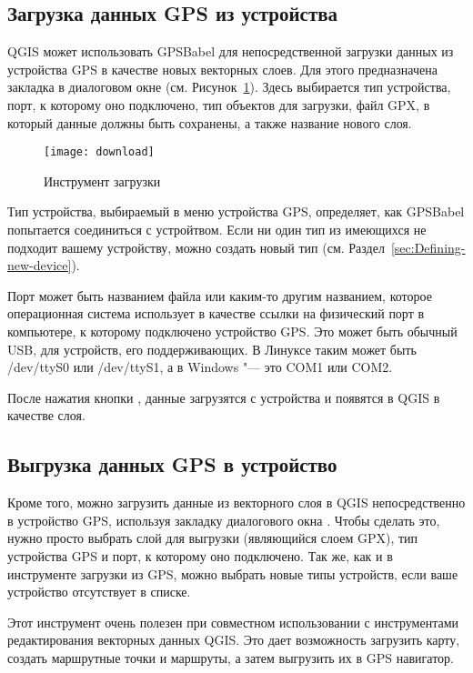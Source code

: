 \subsection{Загрузка данных GPS из устройства}

QGIS может использовать GPSBabel для непосредственной загрузки данных из
устройства GPS в качестве новых векторных слоев. Для этого предназначена
закладка  в диалоговом окне 
(см. Рисунок~\ref{figure_download}). Здесь выбирается тип устройства,
порт, к которому оно подключено, тип объектов для загрузки, файл GPX, в
который данные должны быть сохранены, а также название нового слоя.

\begin{figure}[ht]
   \centering
   \texttt{[image: download]}
   \caption{Инструмент загрузки \wincaption}\label{figure_download}
\end{figure}

Тип устройства, выбираемый в меню устройства GPS, определяет, как
GPSBabel попытается соединиться с устройтвом. Если ни один тип из
имеющихся не подходит вашему устройству, можно создать новый тип
(см. Раздел~\ref{sec:Defining-new-device}).

Порт может быть названием файла или каким-то другим названием, которое
операционная система использует в качестве ссылки на физический порт в
компьютере, к которому подключено устройство GPS. Это может быть
обычный USB, для устройств, его поддерживающих.
\nix В Линуксе таким может быть /dev/ttyS0 или /dev/ttyS1, а в
\win Windows "--- это COM1 или COM2.

После нажатия кнопки , данные загрузятся с устройства и
появятся в QGIS в качестве слоя.

\subsection{Выгрузка данных GPS в устройство}

Кроме того, можно загрузить данные из векторного слоя в QGIS
непосредственно в устройство GPS, используя закладку 
диалогового окна . Чтобы сделать это, нужно просто
выбрать слой для выгрузки (являющийся слоем GPX), тип устройства GPS и
порт, к которому оно подключено. Так же, как и в инструменте загрузки
из GPS, можно выбрать новые типы устройств, если ваше устройство
отсутствует в списке.

Этот инструмент очень полезен при совместном использовании с
инструментами редактирования векторных данных QGIS. Это дает возможность
загрузить карту, создать маршрутные точки и маршруты, а затем выгрузить
их в GPS навигатор.

